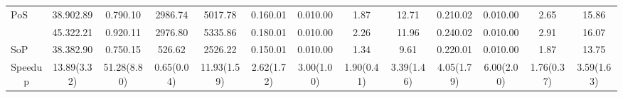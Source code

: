 \documentclass[sigconf, nonacm]{acmart}
\newcommand{\posplus}{\xspace}
\newcommand{\pos}{{P\lowercase{o}S}\xspace}
\newcommand{\sop}{{S\lowercase{o}P}\xspace}
\newcommand{\ssgrl}{\textit{S3GRL}\xspace}
\newcommand{\worst}{\cellcolor[rgb]{0.957,0.8,0.8}}
\newcommand{\best}{\cellcolor[rgb]{0.851,0.918,0.827}}
\begin{document}
\begin{table*}[h!]
{\begin{tabular}{l|cccc|cccc|cccc}
\hline
\pos                         & 38.90{\scriptsize2.89}                                      & 0.79{\scriptsize0.10}                                     & \worst2986.74    & 5017.78                                     & 0.16{\scriptsize0.01}                                      & \best0.01{\scriptsize0.00} & 1.87                                      & \worst12.71      & \best0.21{\scriptsize0.02}  & \best0.01{\scriptsize0.00} & 2.65                                       & 15.86                                        \\
\posplus                       & \worst45.32{\scriptsize2.21}      & \worst0.92{\scriptsize0.11}     & 2976.80                                    & \worst5335.86     & \worst0.18{\scriptsize0.01}      & 0.01{\scriptsize0.00}                                     & \worst2.26      & 11.96                                      & \worst0.24{\scriptsize0.02}      & 0.01{\scriptsize0.00}                                     & \worst2.91       & \worst16.07        \\
\sop                         & \best38.38{\scriptsize2.90}  & \best0.75{\scriptsize0.15} & \best526.62 & \best2526.22 & \best0.15{\scriptsize0.01}  & \worst0.01{\scriptsize0.00}     & \best1.34  & \best9.61   & 0.22{\scriptsize0.01}                                      & \worst0.01{\scriptsize0.00}     & \best1.87   & \best13.75    \\ 
\hline
\multicolumn{1}{c}{Speedup} & 13.89(3.32)                                       & 51.28(8.80)                                     & 0.65(0.04)                                 & \multicolumn{1}{c}{11.93(1.59)}             & 2.62(1.72)                                       & 3.00(1.00)                                            & 1.90(0.41)                                 & \multicolumn{1}{c}{3.39(1.46)}             & 4.05(1.79)                                       & 6.00(2.00)                                            & 1.76(0.37)                                 & 3.59(1.63)                                   \\
\bottomrule
\end{tabular}
}
\caption{Computation time of SGRLs vs. our \ssgrl models: average training time (over 50 epochs), average inference time, preprocessing time, and total runtime (preprocessing, training, and inference time) for 50 epochs. \colorbox[rgb]{0.851,0.918,0.827}{Green} is the fastest and \colorbox[rgb]{0.957,0.8,0.8}{Red} is slowest for each group of SGRLs and \ssgrl. Max(min) speedup corresponds to the ratio of time taken by the slowest (fastest) SGRLs to our fastest (slowest) model.}
\label{resource-cons}
\end{table*}
\end{document}
